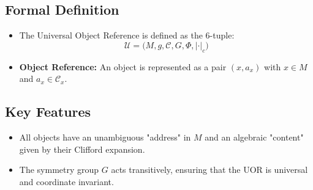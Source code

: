\documentclass[12pt]{article}
\begin{document}
\subsection{Formal Definition}
\begin{itemize}
    \item The Universal Object Reference is defined as the 6-tuple:
    \[
    \mathcal{U} = \bigl(M, g, \mathcal{C}, G, \Phi, |\cdot|_c \bigr)
    \]
    \item \textbf{Object Reference:} An object is represented as a pair \( (x, a_x) \) with \( x \in M \) and \( a_x \in \mathcal{C}_x \).
\end{itemize}

\subsection{Key Features}
\begin{itemize}
    \item All objects have an unambiguous "address" in \( M \) and an algebraic "content" given by their Clifford expansion.
    \item The symmetry group \( G \) acts transitively, ensuring that the UOR is universal and coordinate invariant.
\end{itemize}
\end{document}
